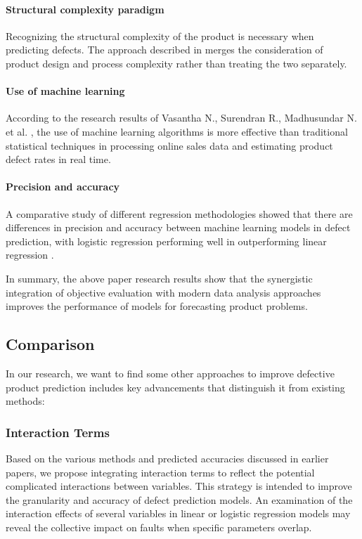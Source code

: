 \documentclass[conference]{IEEEtran}
\begin{document}
\paragraph{Structural complexity paradigm}
Recognizing the structural complexity of the product is necessary when predicting defects. The approach described in \cite{verna2022defect} merges the consideration of product design and process complexity rather than treating the two separately.
\paragraph{Use of machine learning}
 According to the research results of Vasantha N., Surendran R., Madhusundar N. et al. \cite{vasu2022prediction}, the use of machine learning algorithms is more effective than traditional statistical techniques in processing online sales data and estimating product defect rates in real time.
\paragraph{Precision and accuracy}
A comparative study of different regression methodologies showed that there are differences in precision and accuracy between machine learning models in defect prediction, with logistic regression performing well in outperforming linear regression \cite{vasu2022prediction}.

In summary, the above paper research results show that the synergistic integration of objective evaluation with modern data analysis approaches improves the performance of models for forecasting product problems.

\subsection{Comparison}
In our research, we want to find some other approaches to improve defective product prediction includes key advancements that distinguish it from existing methods:
\subsubsection{Interaction Terms}
Based on the various methods and predicted accuracies discussed in earlier papers, we propose integrating interaction terms to reflect the potential complicated interactions between variables. This strategy is intended to improve the granularity and accuracy of defect prediction models. An examination of the interaction effects of several variables in linear or logistic regression models may reveal the collective impact on faults when specific parameters overlap.
\end{document}

